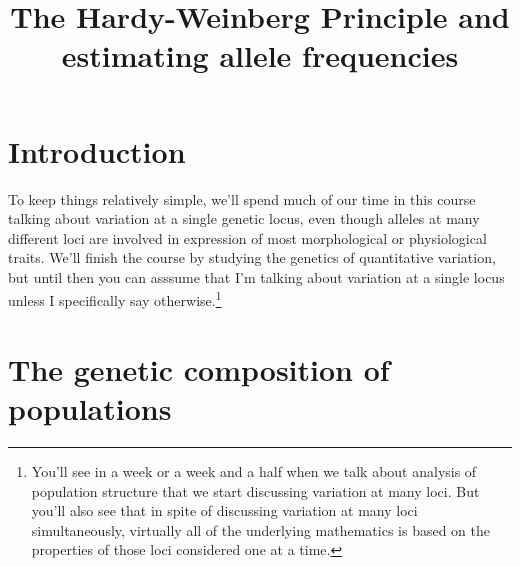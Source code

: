 \documentclass[12pt]{article}
\title{The Hardy-Weinberg Principle and estimating allele frequencies}
\begin{document}
\maketitle

\thispagestyle{first}

\section*{Introduction}

To keep things relatively simple, we'll spend much of our time in this
course talking about variation at a single genetic locus, even though
alleles at many different loci are involved in expression of most
morphological or physiological traits. We'll finish the course by
studying the genetics of quantitative variation, but until then you
can asssume that I'm talking about variation at a single locus unless
I specifically say otherwise.\footnote{You'll see in a week or a week
  and a half when we talk about analysis of population structure that
  we start discussing variation at many loci. But you'll also see that
  in spite of discussing variation at many loci simultaneously,
  virtually all of the underlying mathematics is based on the
  properties of those loci considered one at a time.}

\section*{The genetic composition of populations}
\end{document}
